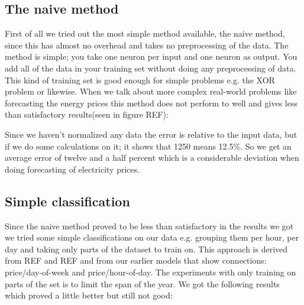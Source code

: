 \subsection{The naive method}
First of all we tried out the most simple method available, the naive method, since this has almost no overhead and takes no preprocessing of the data. The method is simple; you take one neuron per input and one neuron as output. You add all of the data in your training set without doing any preprocessing of data. This kind of training set is good enough for simple problems e.g. the XOR problem or likewise. When we talk about more complex real-world problems like forecasting the energy prices this method does not perform to well and gives less than satisfactory results(seen in figure REF):

\begin{table}[!ht]\footnotesize
\centering  %
\caption{Results from the naive training approach.} %
\label{table:naiveTrainingApproach} %
\end{table}

Since we haven't normalized any data the error is relative to the input data, but if we do some calculations on it; it shows that 1250 means 12.5\%. So we get an average error of twelve and a half percent which is a considerable deviation when doing forecasting of electricity prices. 

\subsection{Simple classification}
Since the naive method proved to be less than satisfactory in the results we got we tried some simple classifications on our data e.g. grouping them per hour, per day and taking only parts of the dataset to train on. This approach is derived from REF and REF and from our earlier models that show connections: price/day-of-week and price/hour-of-day. The experiments with only training on parts of the set is to limit the span of the year. We got the following results which proved a little better but still not good:


